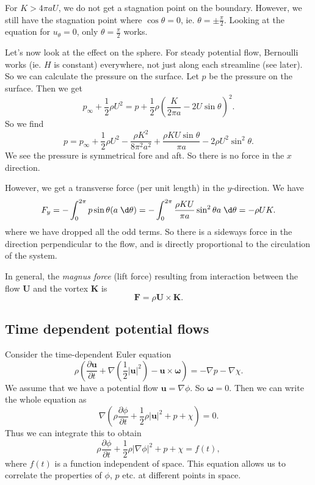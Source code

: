\documentclass[a4paper]{article}
\begin{document}

For $K > 4 \pi a U$, we do not get a stagnation point on the boundary. However, we still have the stagnation point where $\cos \theta = 0$, ie. $\theta = \pm \frac{\pi}{2}$. Looking at the equation for $u_\theta = 0$, only $\theta = \frac{\pi}{2}$ works.


Let's now look at the effect on the sphere. For steady potential flow, Bernoulli works (ie. $H$ is constant) everywhere, not just along each streamline (see later). So we can calculate the pressure on the surface. Let $p$ be the pressure on the surface. Then we get
\[
  p_\infty + \frac{1}{2} \rho U^2 = p + \frac{1}{2} \rho \left(\frac{K}{2\pi a} - 2U \sin \theta\right)^2.
\]
So we find
\[
  p = p_\infty + \frac{1}{2} \rho U^2 - \frac{\rho K^2}{8 \pi^2 a^2} + \frac{\rho KU \sin \theta}{\pi a} - 2\rho U^2 \sin^2 \theta.
\]
We see the pressure is symmetrical fore and aft. So there is no force in the $x$ direction.

However, we get a transverse force (per unit length) in the $y$-direction. We have
\[
  F_y = -\int_0^{2\pi} p \sin \theta (a \;\d \theta) = -\int_0^{2\pi} \frac{\rho K U}{\pi a} \sin^2 \theta a \;\d \theta = - \rho UK.
\]
where we have dropped all the odd terms. So there is a sideways force in the direction perpendicular to the flow, and is directly proportional to the circulation of the system.

In general, the \emph{magnus force} (lift force) resulting from interaction between the flow $\mathbf{U}$ and the vortex $\mathbf{K}$ is
\[
  \mathbf{F} = \rho \mathbf{U}\times \mathbf{K}.
\]
\subsection{Time dependent potential flows}
Consider the time-dependent Euler equation
\[
  \rho\left(\frac{\partial \mathbf{u}}{\partial t} + \nabla\left(\frac{1}{2}|\mathbf{u}|^2\right) - \mathbf{u}\times \boldsymbol\omega\right) = -\nabla p - \nabla \chi.
\]
We assume that we have a potential flow $\mathbf{u} = \nabla \phi$. So $\boldsymbol\omega = 0$. Then we can write the whole equation as
\[
  \nabla \left(\rho \frac{\partial \phi}{\partial t} + \frac{1}{2} \rho |\mathbf{u}|^2 + p + \chi\right) = 0.
\]
Thus we can integrate this to obtain
\[
  \rho \frac{\partial\phi}{\partial t} + \frac{1}{2} \rho |\nabla \phi|^2 + p + \chi = f(t),
\]
where $f(t)$ is a function independent of space. This equation allows us to correlate the properties of $\phi$, $p$ etc. at different points in space.
\end{document}

